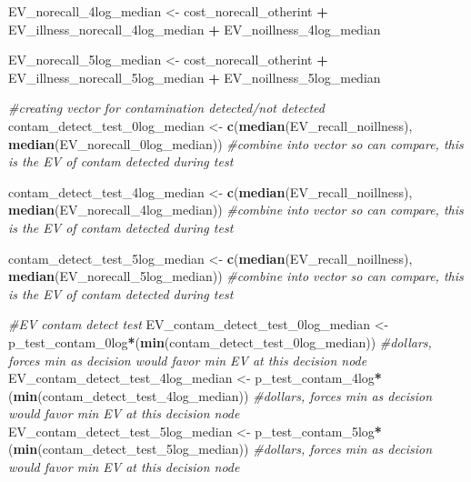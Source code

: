 \documentclass[
]{article}
\newenvironment{Shaded}{\begin{snugshade}}{\end{snugshade}}
\newcommand{\CommentTok}[1]{\textcolor[rgb]{0.56,0.35,0.01}{\textit{#1}}}
\newcommand{\FunctionTok}[1]{\textcolor[rgb]{0.13,0.29,0.53}{\textbf{#1}}}
\newcommand{\NormalTok}[1]{#1}
\newcommand{\OtherTok}[1]{\textcolor[rgb]{0.56,0.35,0.01}{#1}}
\newcommand{\SpecialCharTok}[1]{\textcolor[rgb]{0.81,0.36,0.00}{\textbf{#1}}}
\begin{document}
\begin{Shaded}
\begin{Highlighting}[]
\NormalTok{EV\_norecall\_4log\_median }\OtherTok{\textless{}{-}}\NormalTok{ cost\_norecall\_otherint }\SpecialCharTok{+}\NormalTok{ EV\_illness\_norecall\_4log\_median }\SpecialCharTok{+}\NormalTok{ EV\_noillness\_4log\_median}

\NormalTok{EV\_norecall\_5log\_median }\OtherTok{\textless{}{-}}\NormalTok{ cost\_norecall\_otherint }\SpecialCharTok{+}\NormalTok{ EV\_illness\_norecall\_5log\_median }\SpecialCharTok{+}\NormalTok{ EV\_noillness\_5log\_median}


\CommentTok{\#creating vector for contamination detected/not detected}
\NormalTok{contam\_detect\_test\_0log\_median }\OtherTok{\textless{}{-}} \FunctionTok{c}\NormalTok{(}\FunctionTok{median}\NormalTok{(EV\_recall\_noillness), }\FunctionTok{median}\NormalTok{(EV\_norecall\_0log\_median)) }\CommentTok{\#combine into vector so can compare, this is the EV of contam detected during test}

\NormalTok{contam\_detect\_test\_4log\_median }\OtherTok{\textless{}{-}} \FunctionTok{c}\NormalTok{(}\FunctionTok{median}\NormalTok{(EV\_recall\_noillness), }\FunctionTok{median}\NormalTok{(EV\_norecall\_4log\_median)) }\CommentTok{\#combine into vector so can compare, this is the EV of contam detected during test}

\NormalTok{contam\_detect\_test\_5log\_median }\OtherTok{\textless{}{-}} \FunctionTok{c}\NormalTok{(}\FunctionTok{median}\NormalTok{(EV\_recall\_noillness), }\FunctionTok{median}\NormalTok{(EV\_norecall\_5log\_median)) }\CommentTok{\#combine into vector so can compare, this is the EV of contam detected during test}


\CommentTok{\#EV contam detect test}
\NormalTok{EV\_contam\_detect\_test\_0log\_median }\OtherTok{\textless{}{-}}\NormalTok{ p\_test\_contam\_0log}\SpecialCharTok{*}\NormalTok{(}\FunctionTok{min}\NormalTok{(contam\_detect\_test\_0log\_median)) }\CommentTok{\#dollars, forces min as decision would favor min EV at this decision node}
\NormalTok{EV\_contam\_detect\_test\_4log\_median }\OtherTok{\textless{}{-}}\NormalTok{ p\_test\_contam\_4log}\SpecialCharTok{*}\NormalTok{(}\FunctionTok{min}\NormalTok{(contam\_detect\_test\_4log\_median)) }\CommentTok{\#dollars, forces min as decision would favor min EV at this decision node}
\NormalTok{EV\_contam\_detect\_test\_5log\_median }\OtherTok{\textless{}{-}}\NormalTok{ p\_test\_contam\_5log}\SpecialCharTok{*}\NormalTok{(}\FunctionTok{min}\NormalTok{(contam\_detect\_test\_5log\_median)) }\CommentTok{\#dollars, forces min as decision would favor min EV at this decision node}



\end{Highlighting}
\end{Shaded}
\end{document}
